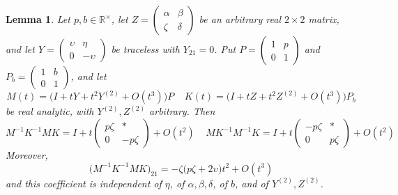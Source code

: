 \documentclass{article}
\theoremstyle{plain}
\theoremstyle{definition}
\theoremstyle{plain}
\theoremstyle{plain}
\theoremstyle{plain}
\newtheorem{lemma}[theorem]{Lemma}
\theoremstyle{remark}
\theoremstyle{remark}
\theoremstyle{plain}
\theoremstyle{plain}
\theoremstyle{plain}
\theoremstyle{plain}
\begin{document}
\begin{lemma}\label{lma:commutatorasymptotics}
Let $p, b \in \mathbb R^\times$, let $Z = \left(\begin{smallmatrix}\alpha&\beta\\\zeta&\delta\end{smallmatrix}\right)$ be an arbitrary real $2\times 2$ matrix, and let $Y = \left(\begin{smallmatrix}\upsilon&\eta\\0&-\upsilon\end{smallmatrix}\right)$ be traceless with $Y_{21} = 0$. Put $P = \left(\begin{smallmatrix}1&p\\0&1\end{smallmatrix}\right)$ and $P_b = \left(\begin{smallmatrix}1&b\\0&1\end{smallmatrix}\right)$, and let
\begin{equation*}
	M(t) = \bigl(I + tY + t^2Y^{(2)} + O(t^3)\bigr)P \ \ \ \ \
	K(t) = \bigl(I + tZ + t^2Z^{(2)} + O(t^3)\bigr)P_b
\end{equation*}
be real analytic, with $Y^{(2)}, Z^{(2)}$ arbitrary. Then
\begin{equation*}
	M^{-1}K^{-1}MK = I + t\begin{pmatrix}p\zeta & * \\ 0 & -p\zeta\end{pmatrix} + O(t^2) \ \ \ \ \
	MK^{-1}M^{-1}K = I + t\begin{pmatrix}-p\zeta & * \\ 0 & p\zeta\end{pmatrix} + O(t^2)
\end{equation*}
Moreover,
\begin{equation*}
	\bigl(M^{-1}K^{-1}MK\bigr)_{21} = -\zeta\bigl(p\zeta + 2\upsilon\bigr)t^2 + O(t^3)
\end{equation*}
and this coefficient is independent of $\eta$, of $\alpha, \beta, \delta$, of $b$, and of $Y^{(2)}, Z^{(2)}$.
\end{lemma}
\end{document}
